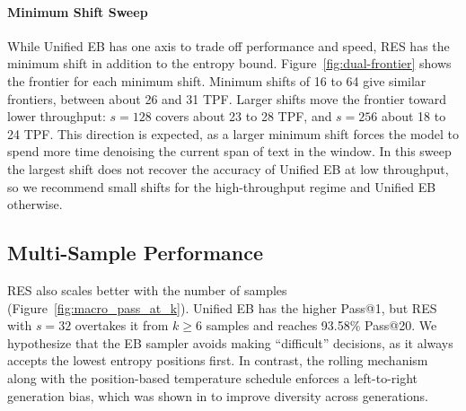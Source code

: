 \paragraph{Minimum Shift Sweep}
While Unified EB has one axis to trade off performance and speed, RES has the minimum shift in addition to the entropy bound.
Figure~\ref{fig:dual-frontier} shows the frontier for each minimum shift.
Minimum shifts of 16 to 64 give similar frontiers, between about 26 and 31 TPF.
Larger shifts move the frontier toward lower throughput: $s=128$ covers about 23 to 28 TPF, and $s=256$ about 18 to 24 TPF.
This direction is expected, as a larger minimum shift forces the model to spend more time denoising the current span of text in the window.
In this sweep the largest shift does not recover the accuracy of Unified EB at low throughput, so we recommend small shifts for the high-throughput regime and Unified EB otherwise.

\subsection{Multi-Sample Performance}
RES also scales better with the number of samples (Figure~\ref{fig:macro_pass_at_k}).
Unified EB has the higher Pass@1, but RES with $s=32$ overtakes it from $k \ge 6$ samples and reaches 93.58\% Pass@20.
We hypothesize that the EB sampler avoids making ``difficult'' decisions, as it always accepts the lowest entropy positions first.
In contrast, the rolling mechanism along with the position-based temperature schedule enforces a left-to-right generation bias, which was shown in \citet{ni2026flexibility} to improve diversity across generations.
